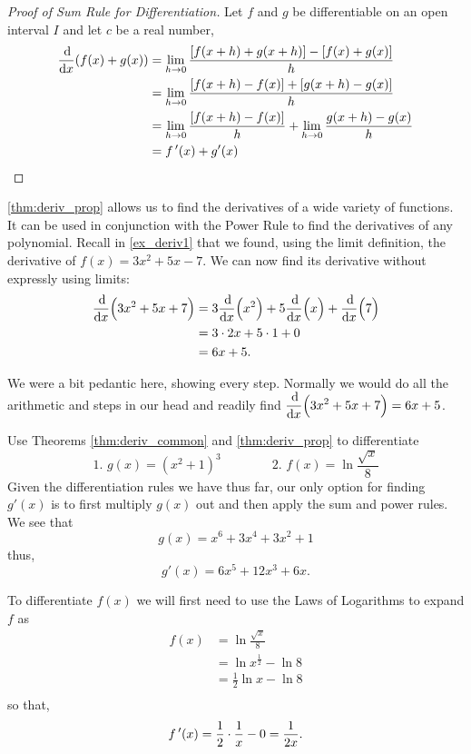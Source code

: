 \begin{proof}[Proof of Sum Rule for Differentiation]
Let $f$ and $g$ be differentiable on an open interval $I$ and let $c$ be a real number,
\begin{align*}
\frac{\operatorname{d}\!}{\operatorname{d}\! x}( f(x) + g(x))
&= \lim_{h\to 0} \frac{[f(x+h)+g(x+h)] - [f(x)+g(x)]}{h} \\
&= \lim_{h\to 0} \frac{[f(x+h)-f(x)] + [g(x+h) - g(x)]}{h} \\
&= \lim_{h\to 0} \frac{[f(x+h)-f(x)]}{h} + \lim_{h\to 0}\frac {g(x+h) - g(x)}{h}\\
&= f\,'(x) + g'(x)\qedhere
\end{align*}
\end{proof}


\autoref{thm:deriv_prop} allows us to find the derivatives of a wide variety of functions. It can be used in conjunction with the Power Rule to find the derivatives of any polynomial. Recall in \autoref{ex_deriv1} that we found, using the limit definition, the derivative of $f(x) = 3x^2+5x-7$. We can now find its derivative without expressly using limits:
\begin{align*}
	\frac{\dd}{\dd x}\Bigl(3x^2+5x+7\Bigr)
	&= 3\frac{\dd}{\dd x}\Bigl(x^2\Bigr) + 5\frac{\dd}{\dd x}\Bigl(x\Bigr) + \frac{\dd}{\dd x}\Bigl(7\Bigr) \\
	&= 3\cdot 2x+5\cdot 1+ 0\\
	&= 6x+5.
\end{align*}

We were a bit pedantic here, showing every step. Normally we would do all the arithmetic and steps in our head and readily find $\displaystyle \frac{\operatorname{d}\!}{\operatorname{d}\! x}\Bigl(3x^2+5x+7\Bigr) = 6x+5$.

\begin{example}\label{ex_der15}%
Use Theorems \ref{thm:deriv_common} and \ref{thm:deriv_prop} to differentiate
\[\text{1. }g(x)=(x^2+1)^3\qquad\qquad\text{2. }f(x)=\ln\frac{\sqrt{x}}8\]
\solution
Given the differentiation rules we have thus far, our only option for finding $g'(x)$ is to first multiply $g(x)$ out and then apply the sum and power rules. We see that
\[g(x) = x^6 + 3x^4 + 3x^2 + 1\]
thus,\vspace{-.5\baselineskip}
\[g'(x) = 6x^5 + 12x^3 + 6x.\]

To differentiate $f(x)$ we will first need to use the Laws of Logarithms to expand $f$ as\vspace{-.5\baselineskip}
\begin{align*}
f(x)
&= \ln \frac{\sqrt x}{8}\\
&= \ln x^{\frac{1}{2}} - \ln 8 \\
&= \frac12\ln x - \ln 8 \\
\end{align*}
so that,\vspace{-.5\baselineskip}
\[f\,'(x)=\frac12\cdot\frac1x-0=\frac1{2x}.\]
\end{example}

